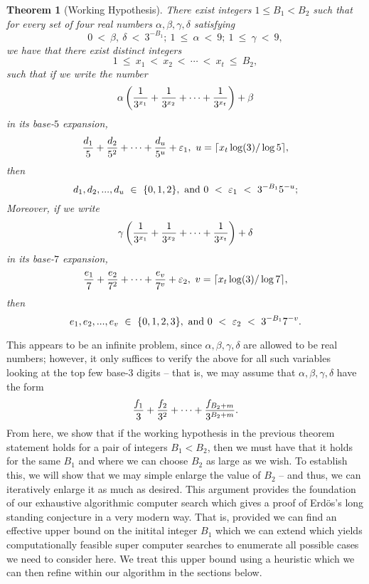\documentclass[12pt]{article}
\newtheorem{theorem}{Theorem}
\begin{document}
\begin{theorem}[Working Hypothesis] 
\label{theorem_InitialWorkingHypothesis} 
There exist integers $1 \leq B_1 < B_2$
such that for every set of four real numbers 
$\alpha, \beta,\gamma,\delta$
satisfying 
$$
0\ <\ \beta,\ \delta\ <\ 3^{-B_1};\ 1\ \leq\ \alpha\ <\ 9;\ 1\ \leq\ 
\gamma\ <\ 9,
$$
we have that there exist distinct integers 
$$
1\ \leq\ x_1\ <\ x_2\ <\ \cdots\ <\ x_t\ \leq\ B_2,
$$
such that if we write the number 
$$
\alpha \left ( {1 \over 3^{x_1}} + {1 \over 3^{x_2}} + \cdots + 
{1 \over 3^{x_t}} \right ) + \beta
$$
in its base-$5$ expansion, 
\begin{equation} 
\label{eqn_InitWorkingHyp_Base-5_cond_v1} 
{d_1 \over 5} + {d_2 \over 5^2} + \cdots + {d_u \over 5^u} + \varepsilon_1,
\ u = \lceil x_t \log(3) / \log 5\rceil,
\end{equation} 
then 
$$
d_1, d_2, ..., d_u\ \in\ \{0,1,2\},\ {\rm and\ } 0\ <\ \varepsilon_1\ <\ 
3^{-B_1} 5^{-u};
$$
Moreover, if we write
$$
\gamma \left ( {1 \over 3^{x_1}} + {1 \over 3^{x_2}} + \cdots + 
{1 \over 3^{x_t}} \right ) + \delta
$$
in its base-$7$ expansion,
\begin{equation} 
\label{eqn_InitWorkingHyp_Base-7_cond_v2}
{e_1 \over 7} + {e_2 \over 7^2} + \cdots + {e_v \over 7^v} + \varepsilon_2,
\ v = \lceil x_t \log(3)/\log 7\rceil,
\end{equation} 
then
$$
e_1, e_2, ..., e_v\ \in\ \{0,1,2,3\},\ {\rm and\ } 0\ <\ \varepsilon_2\ <\ 
3^{-B_1} 7^{-v}.
$$
\end{theorem} 

This appears to be an infinite problem, since $\alpha, \beta, \gamma, \delta$
are allowed to be real numbers; however, it only suffices to verify the
above for all such variables looking at the top few 
base-$3$ digits -- that is, we may assume that $\alpha, \beta, \gamma,
\delta$ have the form
$$
{f_1 \over 3} + {f_2 \over 3^2} + \cdots + {f_{B_2+m} \over 3^{B_2+m}}.
$$
From here, we show that if the working hypothesis in the previous theorem statement holds
for a pair of integers $B_1 < B_2$, then we must have that it holds for 
the same $B_1$ and where we can choose $B_2$ as large as we wish.  To 
establish this, we will show that we may simple enlarge the value of $B_2$ --
and thus, we can iteratively enlarge it as much as desired. 
This argument provides the foundation of our exhaustive algorithmic computer search which 
gives a proof of Erd\"os's long standing conjecture in a very modern way. That is, provided we can 
find an effective upper bound on the initital integer $B_1$ which we can extend which yields 
computationally feasible super computer searches to enumerate all possible cases we need to 
consider here. We treat this upper bound using a heuristic which we can then refine within our 
algorithm in the sections below. 
\end{document}
